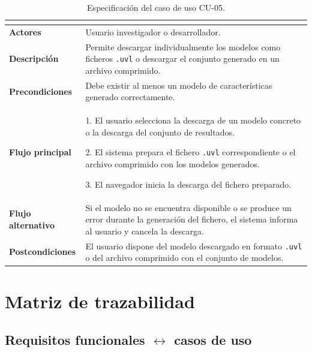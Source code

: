 \begin{table}[H]
\centering
\small
\renewcommand{\arraystretch}{1.35}
\begin{tabular}{@{}>{\bfseries\RaggedRight\arraybackslash}p{4cm} P{10cm}@{}}
\toprule
{} \\
\midrule

Actores &
Usuario investigador o desarrollador. \\

Descripción &
Permite descargar individualmente los modelos como ficheros
\texttt{.uvl} o descargar el conjunto generado en un archivo
comprimido. \\

Precondiciones &
Debe existir al menos un modelo de características generado correctamente. \\

Flujo principal &
1. El usuario selecciona la descarga de un modelo concreto o la
descarga del conjunto de resultados.

2. El sistema prepara el fichero \texttt{.uvl} correspondiente o el
archivo comprimido con los modelos generados.

3. El navegador inicia la descarga del fichero preparado.
\\

Flujo alternativo &
Si el modelo no se encuentra disponible o se produce un error durante la generación del fichero, el sistema informa al usuario y cancela la descarga. \\

Postcondiciones &
El usuario dispone del modelo descargado en formato \texttt{.uvl}
o del archivo comprimido con el conjunto de modelos. \\

\bottomrule
\end{tabular}
\caption{Especificación del caso de uso CU-05.}
\label{tab:uc05}
\end{table}

\section{Matriz de trazabilidad}
\label{sec:trazabilidad}


\subsection{Requisitos funcionales \texorpdfstring{$\leftrightarrow$}{<->} casos de uso}
\label{subsec:trazabilidad_rf_cu}


